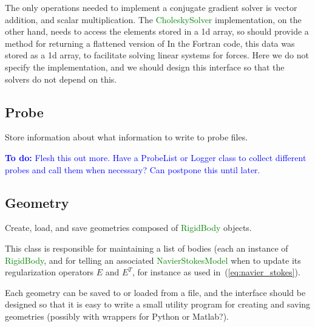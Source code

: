 \documentclass[11pt]{article}
\def\todo#1{\textcolor{blue}{{\bf To do:} #1}}
\def\class#1{\textcolor{green}{\ttfamily\small #1}} %
\begin{document}
The only operations needed to implement a conjugate gradient solver is vector addition, and scalar multiplication.  The \class{CholeskySolver} implementation, on the other hand, needs to access the elements stored in a 1d array, so should provide a method for returning a flattened version of 
In the Fortran code, this data was stored as a 1d array, to facilitate solving linear systems for forces.  Here we do not specify the implementation, and we should design this interface so that the solvers do not depend on this.

\subsection{Probe}
Store information about what information to write to probe files.

\todo{Flesh this out more.  Have a ProbeList or Logger class to collect different probes and call them when necessary?  Can postpone this until later.}

\subsection{Geometry}
Create, load, and save geometries composed of \class{RigidBody} objects.

This class is responsible for maintaining a list of bodies (each an instance of \class{RigidBody}, and for telling an associated \class{NavierStokesModel} when to update its regularization operators $E$ and $E^T$, for instance as used in~(\ref{eq:navier_stokes}).

Each geometry can be saved to or loaded from a file, and the interface should be designed so that it is easy to write a small utility program for creating and saving geometries (possibly with wrappers for Python or Matlab?).  
\end{document}
